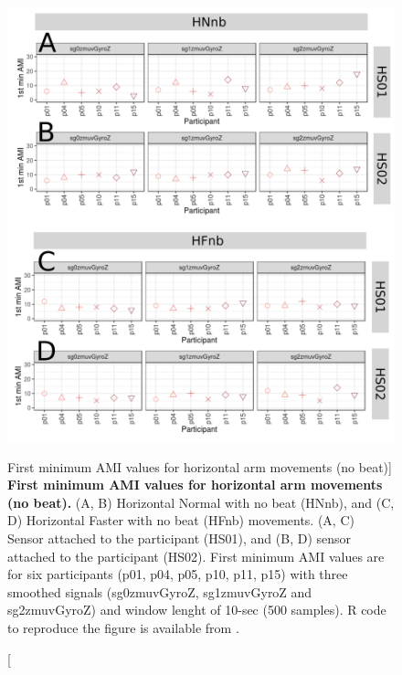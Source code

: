 \begin{figure}
\centering
\includegraphics[width=1.0\textwidth]{ami_Hnb_w10}
	\caption
	[First minimum AMI values for horizontal arm movements (no beat)]{
	{\bf First minimum AMI values for horizontal arm movements (no beat).}
		(A, B) Horizontal Normal with no beat (HNnb), and 
		(C, D) Horizontal Faster with no beat (HFnb) movements.
		(A, C) Sensor attached to the participant (HS01), and
		(B, D) sensor attached to the participant (HS02).
		First minimum AMI values are for six participants 
		(p01, p04, p05, p10, p11, p15) with three smoothed 
		signals (sg0zmuvGyroZ, sg1zmuvGyroZ and sg2zmuvGyroZ) and 
		window lenght of 10-sec (500 samples).
		R code to reproduce the figure is available 
		from \cite{xochicale2018}.
        }
    \label{fig:amiHnb}
\end{figure}
